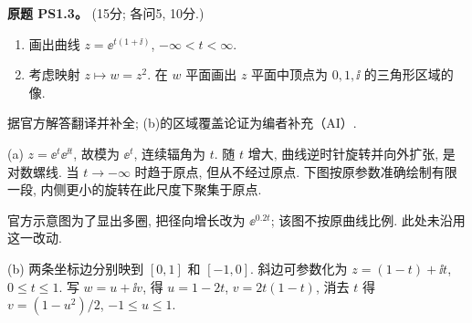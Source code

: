 \begin{exercise}\label{ass:ps1-3}
\textbf{原题 PS1.3。} (15分; 各问5, 10分.)
\begin{enumerate}[label=(\alph*)]
\item 画出曲线 $z=\ee^{t(1+\ii)}$, $-\infty<t<\infty$.
\item 考虑映射 $z\mapsto w=z^2$. 在 $w$ 平面画出 $z$ 平面中顶点为 $0,1,\ii$ 的三角形区域的像.
\end{enumerate}
\end{exercise}
\begin{solution}
据官方解答翻译并补全; (b)的区域覆盖论证为编者补充（AI）.

(a) $z=\ee^t\ee^{\ii t}$, 故模为 $\ee^t$, 连续辐角为 $t$. 随 $t$ 增大, 曲线逆时针旋转并向外扩张, 是对数螺线. 当 $t\to-\infty$ 时趋于原点, 但从不经过原点. 下图按原参数准确绘制有限一段, 内侧更小的旋转在此尺度下聚集于原点.
\begin{center}
\end{center}
官方示意图为了显出多圈, 把径向增长改为 $\ee^{0.2t}$; 该图不按原曲线比例. 此处未沿用这一改动.

(b) 两条坐标边分别映到 $[0,1]$ 和 $[-1,0]$. 斜边可参数化为
$z=(1-t)+\ii t$, $0\le t\le1$. 写 $w=u+\ii v$, 得
$u=1-2t$, $v=2t(1-t)$, 消去 $t$ 得 $v=(1-u^2)/2$, $-1\le u\le1$.


\end{solution}
